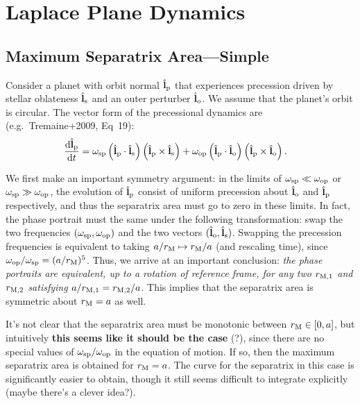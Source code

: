 \documentclass[11pt,
        usenames, %
        dvipsnames %
    ]{article}
\newcommand*{\rd}[2]{\frac{\mathrm{d}#1}{\mathrm{d}#2}}
\newcommand*{\bm}[1]{\boldsymbol{\mathbf{#1}}}
\newcommand*{\uv}[1]{\hat{\bm{#1}}}
\newcommand*{\p}[1]{\left(#1\right)}
\newcommand*{\s}[1]{\left[#1\right]}
\begin{document}
\section{Laplace Plane Dynamics}

\subsection{Maximum Separatrix Area---Simple}

Consider a planet with orbit normal $\uv{l}_{\rm p}$ that experiences precession
driven by stellar oblateness $\uv{l}_{\rm s}$ and an outer perturber
$\uv{l}_{\rm o}$. We assume that the planet's orbit is circular. The vector
form of the precessional dynamics are (e.g.\ Tremaine+2009, Eq~19):
\begin{align}
    \rd{\uv{l}_{\rm p}}{t}
        &= \omega_{\rm sp} \p{\uv{l}_{\rm p} \cdot \uv{l}_{\rm s}}
            \p{\uv{l}_{\rm p} \times \uv{l}_{\rm s}}
            + \omega_{\rm op} \p{\uv{l}_{\rm p} \cdot \uv{l}_{\rm o}}
            \p{\uv{l}_{\rm p} \times \uv{l}_{\rm o}}.
\end{align}

We first make an important symmetry argument: in the limits of $\omega_{\rm sp}
\ll \omega_{\rm op}$ or $\omega_{\rm sp} \gg \omega_{\rm op}$, the evolution of
$\uv{l}_{\rm p}$ consist of uniform precession about $\uv{l}_{\rm o}$ and
$\uv{l}_{\rm p}$ respectively, and thus the separatrix area must go to zero in
these limits. In fact, the phase portrait must the same under the following
transformation: swap the two frequencies $(\omega_{\rm sp}, \omega_{\rm op})$
and the two vectors $(\uv{l}_{\rm o}, \uv{l}_{\rm s})$. Swapping the precession
frequencies is equivalent to taking $a / r_{\rm M} \mapsto r_{\rm M} / a$ (and
rescaling time), since $\omega_{\rm op} / \omega_{\rm sp} = (a / r_{\rm M})^5$.
Thus, we arrive at an important conclusion: \emph{the phase portraits are
equivalent, up to a rotation of reference frame, for any two $r_{\rm M,1}$ and
$r_{\rm M, 2}$ satisfying $a / r_{\rm M, 1} = r_{\rm M, 2} / a$}. This implies
that the separatrix area is symmetric about $r_{\rm M} = a$ as well.

It's not clear that the separatrix area must be monotonic between $r_{\rm M} \in
\s{0, a}$, but intuitively \textbf{this seems like it should be the case} (?),
since there are no special values of $\omega_{\rm sp} / \omega_{\rm op}$ in the
equation of motion. If so, then the maximum separatrix area is obtained for
$r_{\rm M} = a$. The curve for the separatrix in this case is significantly
easier to obtain, though it still seems difficult to integrate explicitly (maybe
there's a clever idea?).
\end{document}
